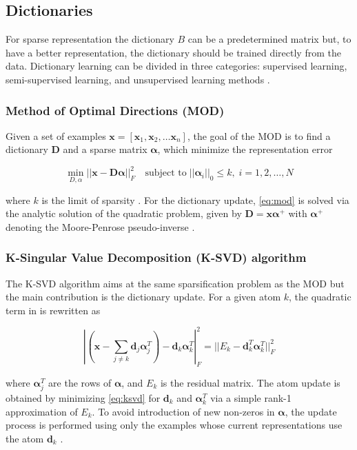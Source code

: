 \subsection{Dictionaries}

For sparse representation the dictionary $B$ can be a predetermined matrix but, to have a better representation, the dictionary should be trained directly from the data. Dictionary learning can be divided in three categories: supervised learning, semi-supervised learning, and unsupervised learning methods \cite{7102696}. 

\subsubsection{Method of Optimal Directions (MOD)}

Given a set of examples $\boldsymbol{x} = [\boldsymbol{x}_1,\boldsymbol{x}_2, \ldots \boldsymbol{x}_n]$, the goal of the MOD is to find a dictionary $\boldsymbol{D}$ and a sparse matrix $\boldsymbol{\alpha}$, which minimize the representation error

\begin{equation}
\min_{D, \alpha}||\boldsymbol{x} - \boldsymbol{D} \boldsymbol{\alpha}||_F^2 \quad \textrm{subject to} \; ||\boldsymbol{\alpha}_i||_0 \leq k, \; i= 1, 2, \ldots , N
\label{eq:mod}
\end{equation}

where $k$ is the limit of sparsity \cite{5452966}. For the dictionary update, \ref{eq:mod} is solved via the analytic solution of the quadratic problem, given by $\boldsymbol{D} = \boldsymbol{x}\boldsymbol{\alpha}^+$ with $\boldsymbol{\alpha}^+$ denoting the Moore-Penrose pseudo-inverse \citep{Ben-Israel2003}.


\subsubsection{K-Singular Value Decomposition (K-SVD) algorithm}

The K-SVD algorithm aims at the same sparsification problem as the MOD \label{eq:mod} but the main contribution is the dictionary update. For a given atom $k$, the quadratic term in \label{eq:mod} is rewritten as

\begin{equation}
\left| \left( \boldsymbol{x} - \sum_{j \neq k} \boldsymbol{d}_j \boldsymbol{\alpha}_j^T \right) - \boldsymbol{d}_k \boldsymbol{\alpha}_k^T \right|^2_F = ||E_k - \boldsymbol{d}_k^T \boldsymbol{\alpha}_k^T||^2_F
\label{eq:ksvd}
\end{equation}

where $\boldsymbol{\alpha}_j^T$ are the rows of $\boldsymbol{\alpha}$, and $E_k$ is the residual matrix.
The atom update is obtained by minimizing \ref{eq:ksvd} for $\boldsymbol{d}_k$ and $\boldsymbol{\alpha}_k^T$ via a simple rank-1 approximation of $E_k$. To avoid introduction of new non-zeros in $\boldsymbol{\alpha}$, the update process is performed using only the examples whose current representations use the atom $\boldsymbol{d}_k$ \cite{5452966}.








